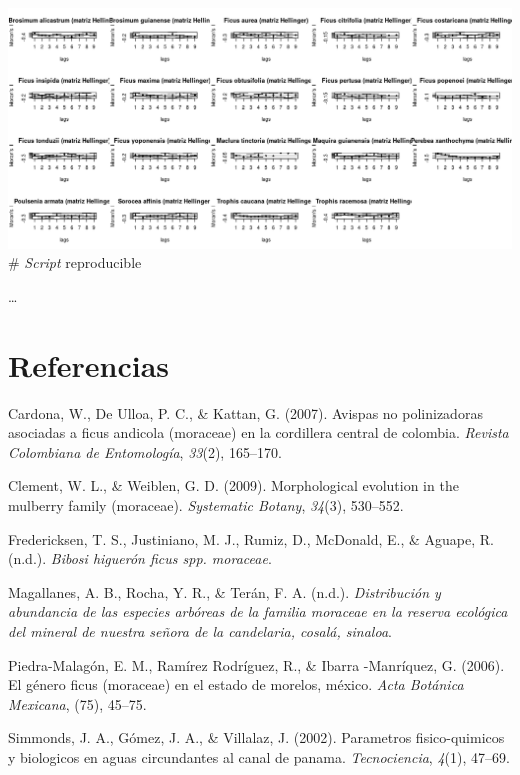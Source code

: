 \documentclass[11pt,]{article}
\begin{document}
\includegraphics[width=1.00000\textwidth]{multiples_especies.png} \#
\emph{Script} reproducible

\ldots

\section*{Referencias}\label{referencias}

\hypertarget{refs}{}
\hypertarget{ref-cardona2007avispas}{}
Cardona, W., De Ulloa, P. C., \& Kattan, G. (2007). Avispas no
polinizadoras asociadas a ficus andicola (moraceae) en la cordillera
central de colombia. \emph{Revista Colombiana de Entomología},
\emph{33}(2), 165--170.

\hypertarget{ref-clement2009morphological}{}
Clement, W. L., \& Weiblen, G. D. (2009). Morphological evolution in the
mulberry family (moraceae). \emph{Systematic Botany}, \emph{34}(3),
530--552.

\hypertarget{ref-fredericksenbibosi}{}
Fredericksen, T. S., Justiniano, M. J., Rumiz, D., McDonald, E., \&
Aguape, R. (n.d.). \emph{Bibosi higuerón ficus spp. moraceae}.

\hypertarget{ref-magallanesdistribucion}{}
Magallanes, A. B., Rocha, Y. R., \& Terán, F. A. (n.d.).
\emph{Distribución y abundancia de las especies arbóreas de la familia
moraceae en la reserva ecológica del mineral de nuestra señora de la
candelaria, cosalá, sinaloa}.

\hypertarget{ref-piedra2006genero}{}
Piedra-Malagón, E. M., Ramírez Rodríguez, R., \& Ibarra -Manríquez, G.
(2006). El género ficus (moraceae) en el estado de morelos, méxico.
\emph{Acta Botánica Mexicana}, (75), 45--75.

\hypertarget{ref-simmonds2002parametros}{}
Simmonds, J. A., Gómez, J. A., \& Villalaz, J. (2002). Parametros
fisico-quimicos y biologicos en aguas circundantes al canal de panama.
\emph{Tecnociencia}, \emph{4}(1), 47--69.
\end{document}
